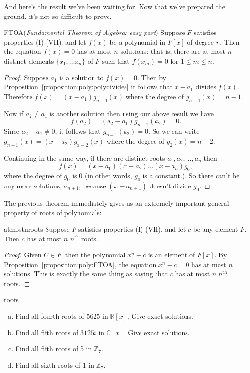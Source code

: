 And here's the result we've been waiting for. Now that we've prepared the ground, it's not so difficult to prove.

\begin{prop}{FTOA}(\emph{Fundamental Theorem of Algebra: easy part})
Suppose $F$ satisfies properties (I)-(VII), and let $f(x)$ be a polynomial in $F[x]$ of degree $n$. Then the equation $f(x)=0$ has at most $n$ solutions: that is, there are at most $n$ distinct elements $\{x_1,\ldots x_n\}$ of $F$ such that $f(x_m)=0$ for $1 \le m \le n$.
\end {prop}


\begin{proof}
Suppose $a_1$ is a solution to $f(x)=0$. Then by Proposition~\ref{proposition:poly:polydivides} it follows that $x-a_1$ divides $f(x)$. Therefore $f(x) = (x-a_1) g_{n-1}(x)$ where the degree of $g_{n-1}(x)=n-1$. 

Now if $a_2 \neq a_1$ is another solution then using our above result we have
\[ f(a_2) = (a_2 - a_1)g_{n-1}(a_2) = 0. \]
Since $a_2 - a_1 \neq 0$, it follows that $g_{n-1}(a_2) = 0$. So we can write $g_{n - 1}(x) = (x-a_2)g_{n-2}(x)$ where the degree of $g_2(x) = n-2$. 

Continuing in the same way, if there are distinct roots $a_1,a_2,...,a_n$ then 
\[
f(x) = (x - a_1)(x - a_2)...(x - a_n)g_0, \]
 where the degree of $g_0$ is 0 (in other words, $g_0$ is a constant.). So there can't be any more solutions, $a_{n+1}$, because $(x-a_{n+1})$ doesn't divide $g_0$.
\end {proof}

The previous theorem immediately gives us an extremely important general property of roots of polynomials:

\begin{prop}{atmostnroots}
Suppose $F$ satisfies properties (I)-(VII), and let $c$ be any element $F$.  Then $c$ has at most $n$ $n^{\text{th}}$ roots.
\end {prop}


\begin{proof}
Given $C \in F$, then the polynomial $x^n-c$ is an element of $F[x]$. By Proposition~\ref{proposition:poly:FTOA}, the equation $x^n-c=0$ has at most $n$ solutions.  This is exactly the same thing as saying that $c$ has at most $n$ $n^{\text{th}}$ roots.
\end {proof}

\begin{exercise}{roots}
\begin {enumerate}[(a)]
\item
Find all fourth roots of 5625 in $\mathbb{R}[x]$. Give exact solutions.
\item
Find all fifth roots of $3125i$ in $\mathbb{C}[x]$. Give exact solutions. 
\item
Find all fifth roots of 5 in $\mathbb{Z}_7$.
\item
Find all sixth roots of 1 in $\mathbb{Z}_7$.
\end{enumerate}
\end{exercise}

